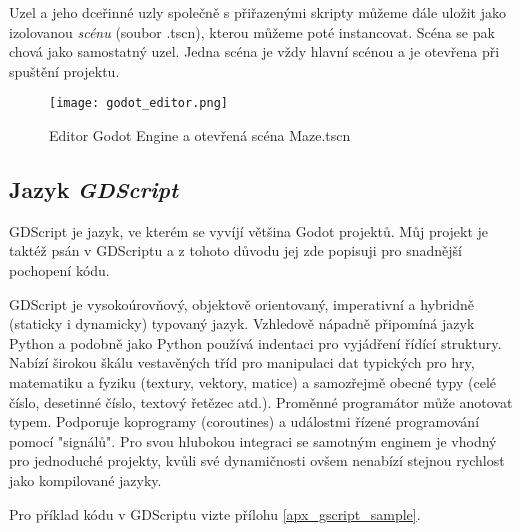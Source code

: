 Uzel a jeho dceřinné uzly společně s přiřazenými skripty můžeme dále uložit jako izolovanou \textit{scénu} (soubor .tscn), kterou můžeme poté instancovat. Scéna se pak chová jako samostatný uzel. Jedna scéna je vždy hlavní scénou a je otevřena při spuštění projektu.

\begin{figure}[H]
  \centering
  \texttt{[image: godot\_editor.png]}
  \caption{Editor Godot Engine a otevřená scéna Maze.tscn}
  \label{godot_editor_maze_tscn}
\end{figure}

\subsection{Jazyk \textit{GDScript}}

GDScript je jazyk, ve kterém se vyvíjí většina Godot projektů. Můj projekt je taktéž psán v GDScriptu a z tohoto důvodu jej zde popisuji pro snadnější pochopení kódu.

GDScript je vysokoúrovňový, objektově orientovaný, imperativní a hybridně (staticky i dynamicky) typovaný jazyk. Vzhledově nápadně připomíná jazyk Python a podobně jako Python používá indentaci pro vyjádření řídící struktury. Nabízí širokou škálu vestavěných tříd pro manipulaci dat typických pro hry, matematiku a fyziku (textury, vektory, matice) a samozřejmě obecné typy (celé číslo, desetinné číslo, textový řetězec atd.). Proměnné programátor může anotovat typem. Podporuje koprogramy (coroutines) a událostmi řízené programování pomocí "signálů". Pro svou hlubokou integraci se samotným enginem je vhodný pro jednoduché projekty, kvůli své dynamičnosti ovšem nenabízí stejnou rychlost jako kompilované jazyky. \cite{gdscript_reference}

Pro příklad kódu v GDScriptu vizte přílohu \ref{apx_gscript_sample}.